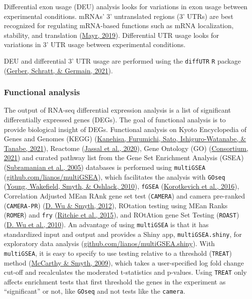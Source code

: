 \documentclass[12pt,twoside]{reedthesis}
\begin{document}
Differential exon usage (DEU) analysis looks for variations in exon
usage between experimental conditions. mRNAs' 3' untranslated regions
(3' UTRs) are best recognized for regulating mRNA-based functions such
as mRNA localization, stability, and translation (\protect\hyperlink{ref-mayr2019}{Mayr, 2019}).
Differential UTR usage looks for variations in 3' UTR usage between
experimental conditions.

DEU and differential 3' UTR usage are performed using the \texttt{diffUTR} \texttt{R}
package (\protect\hyperlink{ref-gerber2021}{Gerber, Schratt, \& Germain, 2021}).

\hypertarget{m3.2.7}{%
\subsubsection*{Functional analysis}\label{m3.2.7}}

The output of RNA-seq differential expression analysis is a list of
significant differentially expressed genes (DEGs). The goal of
functional analysis is to provide biological insight of DEGs. Functional
analysis on Kyoto Encyclopedia of Genes and Genomes (KEGG)
(\protect\hyperlink{ref-kanehisa2021}{Kanehisa, Furumichi, Sato, Ishiguro-Watanabe, \& Tanabe, 2021}), Reactome (\protect\hyperlink{ref-jassal2020}{Jassal et al., 2020}), Gene Ontology (GO)
(\protect\hyperlink{ref-consortium2021}{Consortium, 2021}) and curated pathway list from the Gene Set Enrichment
Analysis (GSEA) (\protect\hyperlink{ref-subramanian2005}{Subramanian et al., 2005}) databases is performed using
\texttt{multiGSEA}
(\href{https://github.com/lianos/multiGSEA}{github.com/lianos/multiGSEA}),
which facilitates the analysis with \texttt{GOseq} (\protect\hyperlink{ref-young2010}{Young, Wakefield, Smyth, \& Oshlack, 2010}), \texttt{fGSEA}
(\protect\hyperlink{ref-korotkevich2016}{Korotkevich et al., 2016}), Correlation Adjusted MEan RAnk gene set test
(\texttt{CAMERA}) and camera pre-ranked (\texttt{CAMERA-PR}) (\protect\hyperlink{ref-wu2012}{D. Wu \& Smyth, 2012}), ROtation testing
using MEan Ranks (\texttt{ROMER}) and \texttt{fry} (\protect\hyperlink{ref-ritchie2015}{Ritchie et al., 2015}), and ROtAtion gene Set
Testing (\texttt{ROAST}) (\protect\hyperlink{ref-wu2010}{D. Wu et al., 2010}). An advantage of using \texttt{multiGSEA} is that it
has standardized input and output and provides a Shiny app, \texttt{multiGSEA.shiny}, for
exploratory data analysis
(\href{https://github.com/lianos/multiGSEA.shiny}{github.com/lianos/multiGSEA.shiny}).
With \texttt{multiGSEA}, it is easy to specify to use testing relative to a
threshold (\texttt{TREAT}) method (\protect\hyperlink{ref-mccarthy2009}{McCarthy \& Smyth, 2009}), which takes a user-specified
log fold change cut-off and recalculates the moderated t-statistics and
p-values. Using \texttt{TREAT} only affects enrichment tests that first threshold
the genes in the experiment as ``significant'' or not, like \texttt{GOseq} and not
tests like the \texttt{camera}.
\end{document}
